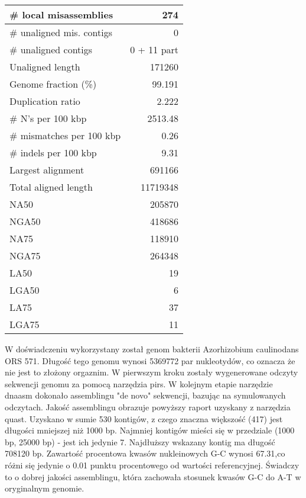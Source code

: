 \documentclass[a4paper]{article}
\begin{document}
\begin{table}[ht]
\begin{center}
\begin{tabular}{|l*{1}{|r}|}
\# local misassemblies & 274 \\ \hline
\# unaligned mis. contigs & 0 \\ \hline
\# unaligned contigs & 0 + 11 part \\ \hline
Unaligned length & 171260 \\ \hline
Genome fraction (\%) & 99.191 \\ \hline
Duplication ratio & 2.222 \\ \hline
\# N's per 100 kbp & 2513.48 \\ \hline
\# mismatches per 100 kbp & 0.26 \\ \hline
\# indels per 100 kbp & 9.31 \\ \hline
Largest alignment & 691166 \\ \hline
Total aligned length & 11719348 \\ \hline
NA50 & 205870 \\ \hline
NGA50 & 418686 \\ \hline
NA75 & 118910 \\ \hline
NGA75 & 264348 \\ \hline
LA50 & 19 \\ \hline
LGA50 & 6 \\ \hline
LA75 & 37 \\ \hline
LGA75 & 11 \\ \hline
\end{tabular}
\end{center}
\end{table}

W doświadczeniu wykorzystany został genom bakterii Azorhizobium caulinodans ORS 571. Długość tego genomu wynosi 5369772 par nukleotydów, co oznacza że nie jest to złożony orgaznim. W pierwszym kroku zostały wygenerowane odczyty sekwencji genomu za pomocą narzędzia pirs. W kolejnym etapie narzędzie dnaasm dokonało assemblingu "de novo" sekwencji, bazując na symulowanych odczytach. Jakość assemblingu obrazuje powyższy raport uzyskany z narzędzia quast. Uzyskano w sumie 530 kontigów, z czego znaczna większość (417) jest długości mniejszej niż 1000 bp. Najmniej kontigów mieści się w przedziale (1000 bp, 25000 bp) - jest ich jedynie 7. Najdłuższy wskazany kontig ma długość 708120 bp. Zawartość procentowa kwasów nukleinowych G-C wynosi 67.31,co różni się jedynie o 0.01 punktu procentowego od wartości referencyjnej. Świadczy to o dobrej jakości assemblingu, która zachowała stosunek kwasów G-C do A-T w oryginalnym genomie. 
\end{document}
